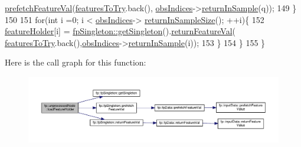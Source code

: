 \begin{DoxyCode}
      \hyperlink{classfp_1_1fpSingleton_ab789c4e4bfb3248711a5857015008f8d}{prefetchFeatureVal}(\hyperlink{classfp_1_1unprocessedNode_ab625569c5339dfbe93b487765f530313}{featuresToTry}.back(),
      \hyperlink{classfp_1_1unprocessedNode_aba9f03124658f62906fa8ded53cef535}{obsIndices}->\hyperlink{classfp_1_1stratifiedInNodeClassIndices_a2d7e802fb97db0367bb8e8f31d393afd}{returnInSample}(q));
149                         \}
150                         
151                         \textcolor{keywordflow}{for}(\textcolor{keywordtype}{int} i =0; i < \hyperlink{classfp_1_1unprocessedNode_aba9f03124658f62906fa8ded53cef535}{obsIndices}->
      \hyperlink{classfp_1_1stratifiedInNodeClassIndices_a596235ffec7250fabd2818d395b39c66}{returnInSampleSize}(); ++i)\{
152                             \hyperlink{classfp_1_1unprocessedNode_ac2a435f6f38c5c0d2b4ba4b721fd5eaa}{featureHolder}[i] = 
      \hyperlink{classfp_1_1fpSingleton_a8bdae77b68521003e3fc630edec2e240}{fpSingleton::getSingleton}().\hyperlink{classfp_1_1fpSingleton_aacc2eb894a219e2fe234743b51fa1a76}{returnFeatureVal}(
      \hyperlink{classfp_1_1unprocessedNode_ab625569c5339dfbe93b487765f530313}{featuresToTry}.back(),\hyperlink{classfp_1_1unprocessedNode_aba9f03124658f62906fa8ded53cef535}{obsIndices}->\hyperlink{classfp_1_1stratifiedInNodeClassIndices_a2d7e802fb97db0367bb8e8f31d393afd}{returnInSample}(i));
153                         \}
154                     \}
155                 \}
\end{DoxyCode}
Here is the call graph for this function\+:
\nopagebreak
\begin{figure}[H]
\begin{center}
\leavevmode
\includegraphics[width=350pt]{classfp_1_1unprocessedNode_a8cedeb8c4c88345ff97f9afb89b3ccd0_cgraph}
\end{center}
\end{figure}
\mbox{\label{classfp_1_1unprocessedNode_af5580595b612e9b3f5ddc4f28c43775c}} 
